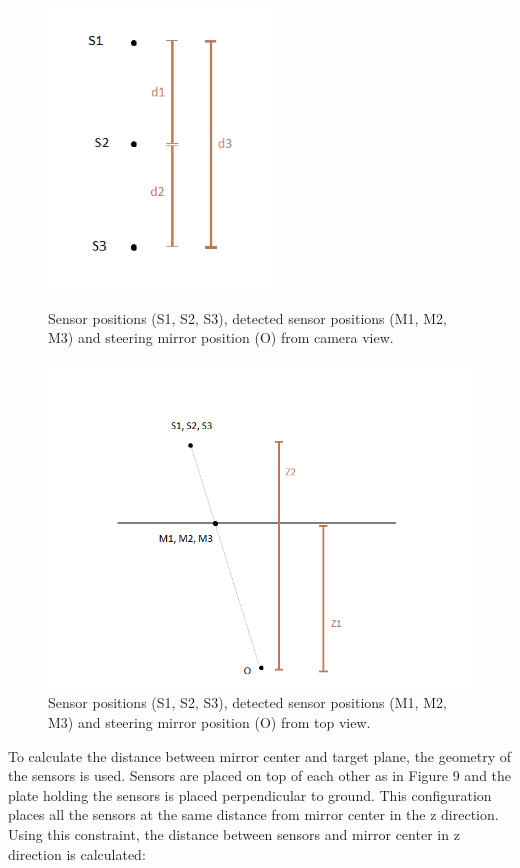 \begin{figure}[!htb]\centering
    \includegraphics*[width = 6cm]{bilder/project/sensor_setup_camera.png}
    \caption{Sensor positions (S1, S2, S3), detected sensor positions (M1, M2, M3) and steering mirror position (O) from camera view.}
    \label{fig:sensor_geometry_camera}

    \includegraphics*[width = 16cm]{bilder/project/sensor_setup_top.png}
    \caption{Sensor positions (S1, S2, S3), detected sensor positions (M1, M2, M3) and steering mirror position (O) from top view.}
    \label{fig:sensor_geometry_top}
\end{figure}




To calculate the distance between mirror center and target plane,
the geometry of the sensors is used. Sensors are placed on top
of each other as in Figure 9 and the plate holding the sensors is
placed perpendicular to ground. This configuration places all the
sensors at the same distance from mirror center in the z direction.
Using this constraint, the distance between sensors and mirror
center in z direction is calculated:

